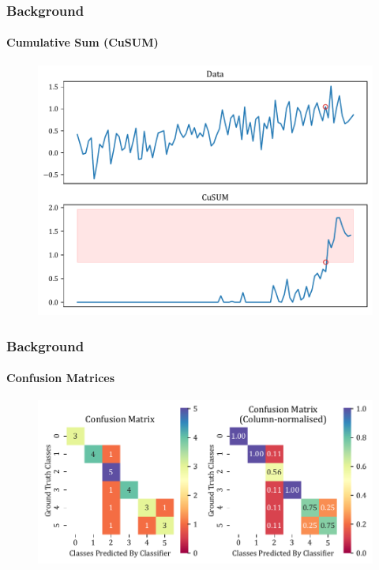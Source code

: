 \documentclass[xcolor={svgnames,table},10pt,fleqn]{beamer}
\begin{document}
\begin{frame}
    \frametitle{Background}
    \framesubtitle{Cumulative Sum (CuSUM)}
    \begin{figure}
        \includegraphics[width=\textwidth]{imgs/cusum.pdf}
    \end{figure}
\end{frame}


\begin{frame}
    \frametitle{Background}
    \framesubtitle{Confusion Matrices}
    \begin{figure}
        \includegraphics[width=\textwidth]{imgs/conf_mats.pdf}
    \end{figure}
\end{frame}
\end{document}
